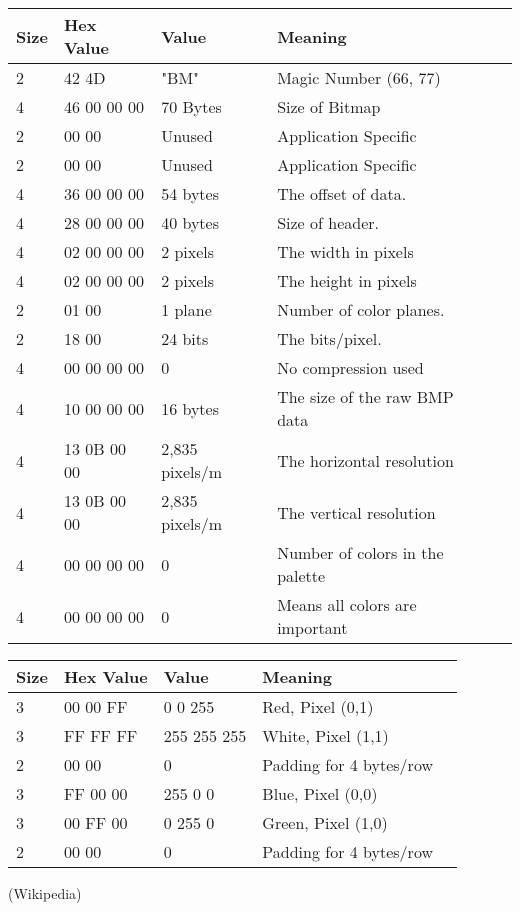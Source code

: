 \begin{frame}[fragile]
\begin{center}
\begin{tabular}{lllll}
\toprule
Size & Hex Value & Value & Meaning\\
\midrule
2 & 42 4D  &"BM"  &Magic Number (66, 77)\\
4 & 46 00 00 00 & 70 Bytes & Size of Bitmap\\
2 & 00 00 & Unused & Application Specific\\
2 & 00 00 & Unused & Application Specific\\
4 & 36 00 00 00 & 54 bytes & The offset of data.\\
4 & 28 00 00 00 & 40 bytes & Size of header. \\
4 & 02 00 00 00 & 2 pixels & The width in pixels\\
4 & 02 00 00 00 & 2 pixels & The height in pixels\\
2 & 01 00 & 1 plane & Number of color planes.\\
2 & 18 00 & 24 bits & The bits/pixel.\\
4 & 00 00 00 00 & 0 & No compression used\\
4 & 10 00 00 00 & 16 bytes & The size of the raw BMP data\\
4 & 13 0B 00 00 & 2,835 pixels/m& The horizontal resolution\\
4 & 13 0B 00 00 & 2,835 pixels/m& The vertical resolution\\
4 & 00 00 00 00 & 0 & Number of colors in the palette\\
4 & 00 00 00 00 & 0 & Means all colors are important\\
\bottomrule
\end{tabular}
\end{center}
\end{frame}

\begin{frame}[fragile]
\begin{center}
\begin{tabular}{lllll}
\toprule
Size & Hex Value & Value & Meaning\\
\midrule
3 & 00 00 FF & 0 0 255 & Red, Pixel (0,1)\\
3 & FF FF FF & 255 255 255 &  White, Pixel (1,1)\\
2 & 00 00    & 0 & Padding for 4 bytes/row\\
3 & FF 00 00 & 255 0 0 & Blue, Pixel (0,0)\\
3 & 00 FF 00 & 0 255 0 & Green, Pixel (1,0)\\
2 & 00 00    & 0  & Padding for 4 bytes/row\\
\bottomrule
\end{tabular}
\end{center}


\begin{flushright}
(Wikipedia)
\end{flushright}

\end{frame}

